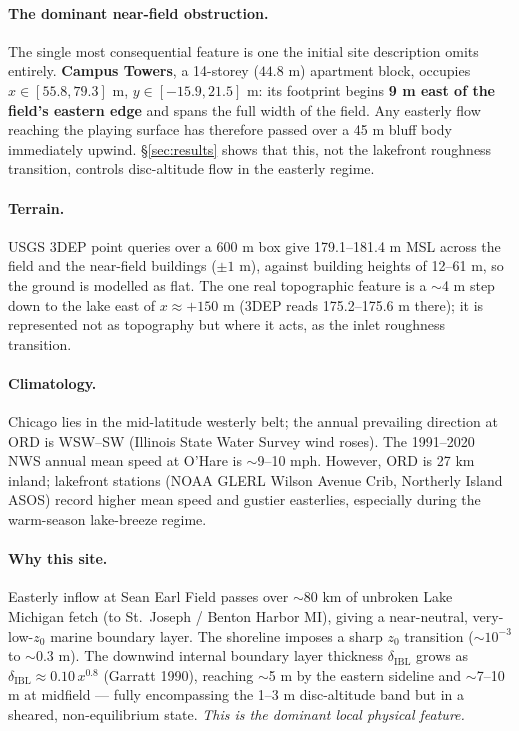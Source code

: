 \documentclass[11pt,letterpaper]{article}
\begin{document}
\paragraph{The dominant near-field obstruction.} The single most consequential
feature is one the initial site description omits entirely. \textbf{Campus
Towers}, a 14-storey ($44.8$ m) apartment block, occupies
$x \in [55.8, 79.3]$ m, $y \in [-15.9, 21.5]$ m: its footprint begins
\textbf{9 m east of the field's eastern edge} and spans the full width of the
field. Any easterly flow reaching the playing surface has therefore passed
over a 45 m bluff body immediately upwind. \S\ref{sec:results} shows that this,
not the lakefront roughness transition, controls disc-altitude flow in the
easterly regime.

\paragraph{Terrain.} USGS 3DEP point queries over a 600 m box give
179.1--181.4 m MSL across the field and the near-field buildings ($\pm 1$ m),
against building heights of 12--61 m, so the ground is modelled as flat. The
one real topographic feature is a $\sim$4 m step down to the lake east of
$x \approx +150$ m (3DEP reads 175.2--175.6 m there); it is represented not as
topography but where it acts, as the inlet roughness transition.

\paragraph{Climatology.} Chicago lies in the mid-latitude westerly belt; the annual prevailing direction at ORD is WSW--SW (Illinois State Water Survey wind roses). The 1991--2020 NWS annual mean speed at O'Hare is $\sim$9--10 mph. However, ORD is 27 km inland; lakefront stations (NOAA GLERL Wilson Avenue Crib, Northerly Island ASOS) record higher mean speed and gustier easterlies, especially during the warm-season lake-breeze regime.

\paragraph{Why this site.} Easterly inflow at Sean Earl Field passes over $\sim$80 km of unbroken Lake Michigan fetch (to St.\ Joseph / Benton Harbor MI), giving a near-neutral, very-low-$z_0$ marine boundary layer. The shoreline imposes a sharp $z_0$ transition ($\sim 10^{-3}$ to $\sim$0.3 m). The downwind internal boundary layer thickness $\delta_{\text{IBL}}$ grows as $\delta_{\text{IBL}} \approx 0.10\,x^{0.8}$ (Garratt 1990), reaching $\sim$5 m by the eastern sideline and $\sim$7--10 m at midfield --- fully encompassing the 1--3 m disc-altitude band but in a sheared, non-equilibrium state. \emph{This is the dominant local physical feature.}
\end{document}
